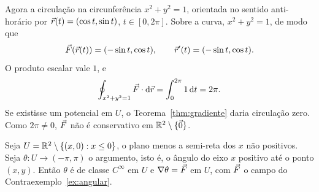\documentclass[11pt,a4paper]{article}
\begin{document}
Agora a circulação na circunferência $x^2+y^2=1$, orientada no sentido anti-horário por $\vec{r}(t)=(\cos t,\sin t)$, $t\in[0,2\pi]$. Sobre a curva, $x^2+y^2=1$, de modo que
\[
\vec{F}(\vec{r}(t))=(-\sin t,\cos t),\qquad\vec{r}'(t)=(-\sin t,\cos t).
\]
O produto escalar vale $1$, e
\[
\oint_{x^2+y^2=1}\vec{F}\cdot\mathrm{d}\vec{r}
=\int_0^{2\pi}1\,\mathrm{d} t=2\pi.
\]
Se existisse um potencial em $U$, o Teorema~\ref{thm:gradiente} daria circulação zero. Como $2\pi\neq 0$, $\vec{F}$ não é conservativo em $\mathbb{R}^2\setminus\{\vec{0}\}$.


\begin{proposicao}
\label{prop:theta}
Seja $U=\mathbb{R}^2\setminus\{(x,0):x\le 0\}$, o plano menos a semi-reta dos $x$ não positivos. Seja $\theta\colon U\to(-\pi,\pi)$ o argumento, isto é, o ângulo do eixo $x$ positivo até o ponto $(x,y)$. Então $\theta$ é de classe $C^\infty$ em $U$ e $\nabla\theta=\vec{F}$ em $U$, com $\vec{F}$ o campo do Contraexemplo~\ref{ex:angular}.
\end{proposicao}
\end{document}

